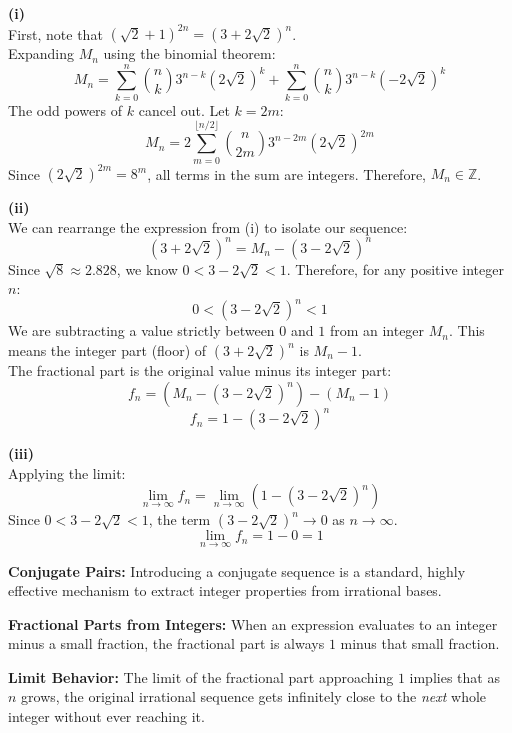 \begin{solution}
\textbf{(i)} \\
First, note that $(\sqrt{2} + 1)^{2n} = (3 + 2\sqrt{2})^n$. \\
Expanding $M_n$ using the binomial theorem:
\[M_n = \sum_{k=0}^{n} \binom{n}{k} 3^{n-k} (2\sqrt{2})^k + \sum_{k=0}^{n} \binom{n}{k} 3^{n-k} (-2\sqrt{2})^k\]
The odd powers of $k$ cancel out. Let $k = 2m$:
\[M_n = 2 \sum_{m=0}^{\lfloor n/2 \rfloor} \binom{n}{2m} 3^{n-2m} (2\sqrt{2})^{2m}\]
Since $(2\sqrt{2})^{2m} = 8^m$, all terms in the sum are integers. Therefore, $M_n \in \mathbb{Z}$.

\vspace{0.3cm}
\textbf{(ii)} \\
We can rearrange the expression from (i) to isolate our sequence:
\[(3 + 2\sqrt{2})^n = M_n - (3 - 2\sqrt{2})^n\]
Since $\sqrt{8} \approx 2.828$, we know $0 < 3 - 2\sqrt{2} < 1$. Therefore, for any positive integer $n$:
\[0 < (3 - 2\sqrt{2})^n < 1\]
We are subtracting a value strictly between $0$ and $1$ from an integer $M_n$. This means the integer part (floor) of $(3 + 2\sqrt{2})^n$ is $M_n - 1$. \\
The fractional part is the original value minus its integer part:
\[f_n = \left(M_n - (3 - 2\sqrt{2})^n\right) - (M_n - 1)\]
\[f_n = 1 - (3 - 2\sqrt{2})^n\]

\vspace{0.3cm}
\textbf{(iii)} \\
Applying the limit:
\[\lim_{n \to \infty} f_n = \lim_{n \to \infty} \left( 1 - (3 - 2\sqrt{2})^n \right)\]
Since $0 < 3 - 2\sqrt{2} < 1$, the term $(3 - 2\sqrt{2})^n \to 0$ as $n \to \infty$.
\[\lim_{n \to \infty} f_n = 1 - 0 = 1\]
\end{solution}

\begin{takeaways}
    \item \textbf{Conjugate Pairs:} Introducing a conjugate sequence is a standard, highly effective mechanism to extract integer properties from irrational bases.
    \item \textbf{Fractional Parts from Integers:} When an expression evaluates to an integer minus a small fraction, the fractional part is always $1$ minus that small fraction. 
    \item \textbf{Limit Behavior:} The limit of the fractional part approaching $1$ implies that as $n$ grows, the original irrational sequence gets infinitely close to the \textit{next} whole integer without ever reaching it.
\end{takeaways}

